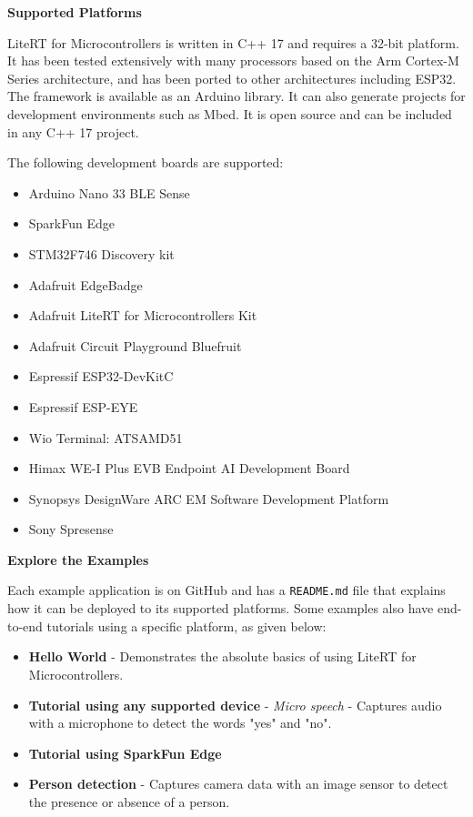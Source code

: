 \textbf{Supported Platforms}

LiteRT for Microcontrollers is written in C++ 17 and requires a 32-bit platform. It has been tested extensively with many processors based on the Arm Cortex-M Series architecture, and has been ported to other architectures including ESP32. The framework is available as an Arduino library. It can also generate projects for development environments such as Mbed. It is open source and can be included in any C++ 17 project.\cite{litert:2023}

The following development boards are supported:

\begin{itemize}
	\item Arduino Nano 33 BLE Sense
	\item SparkFun Edge
	\item STM32F746 Discovery kit
	\item Adafruit EdgeBadge
	\item Adafruit LiteRT for Microcontrollers Kit
	\item Adafruit Circuit Playground Bluefruit
	\item Espressif ESP32-DevKitC
	\item Espressif ESP-EYE
	\item Wio Terminal: ATSAMD51
	\item Himax WE-I Plus EVB Endpoint AI Development Board
	\item Synopsys DesignWare ARC EM Software Development Platform
	\item Sony Spresense
\end{itemize}

\textbf{Explore the Examples}

Each example application is on GitHub and has a \texttt{README.md} file that explains how it can be deployed to its supported platforms.\cite{litert:2023} Some examples also have end-to-end tutorials using a specific platform, as given below:

\begin{itemize}
	\item \textbf{Hello World} - Demonstrates the absolute basics of using LiteRT for Microcontrollers.
	\item \textbf{Tutorial using any supported device} - \textit{Micro speech} - Captures audio with a microphone to detect the words "yes" and "no".
	\item \textbf{Tutorial using SparkFun Edge}
	\item \textbf{Person detection} - Captures camera data with an image sensor to detect the presence or absence of a person.
\end{itemize}

